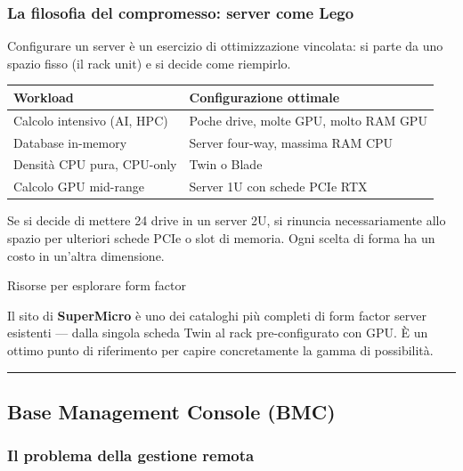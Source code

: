 \documentclass[
  italian,
  openany]{book}
\newcounter{none} %
\begin{document}
\subsubsection{La filosofia del compromesso: server come
Lego}\label{la-filosofia-del-compromesso-server-come-lego}

Configurare un server è un esercizio di ottimizzazione vincolata: si
parte da uno spazio fisso (il rack unit) e si decide come riempirlo.

{\def\LTcaptype{none} %
\begin{longtable}[]{@{}ll@{}}
\toprule\noalign{}
Workload & Configurazione ottimale \\
\midrule\noalign{}
\endhead
\bottomrule\noalign{}
\endlastfoot
Calcolo intensivo (AI, HPC) & Poche drive, molte GPU, molto RAM GPU \\
Database in-memory & Server four-way, massima RAM CPU \\
Densità CPU pura, CPU-only & Twin o Blade \\
Calcolo GPU mid-range & Server 1U con schede PCIe RTX \\
\end{longtable}
}

Se si decide di mettere 24 drive in un server 2U, si rinuncia
necessariamente allo spazio per ulteriori schede PCIe o slot di memoria.
Ogni scelta di forma ha un costo in un'altra dimensione.

\begin{callouttip}{Risorse per esplorare form factor}

Il sito di \textbf{SuperMicro} è uno dei cataloghi più completi di form
factor server esistenti --- dalla singola scheda Twin al rack
pre-configurato con GPU. È un ottimo punto di riferimento per capire
concretamente la gamma di possibilità.

\end{callouttip}

\begin{center}\rule{0.5\linewidth}{0.5pt}\end{center}

\subsection{Base Management Console
(BMC)}\label{base-management-console-bmc}

\subsubsection{Il problema della gestione
remota}\label{il-problema-della-gestione-remota}
\end{document}
